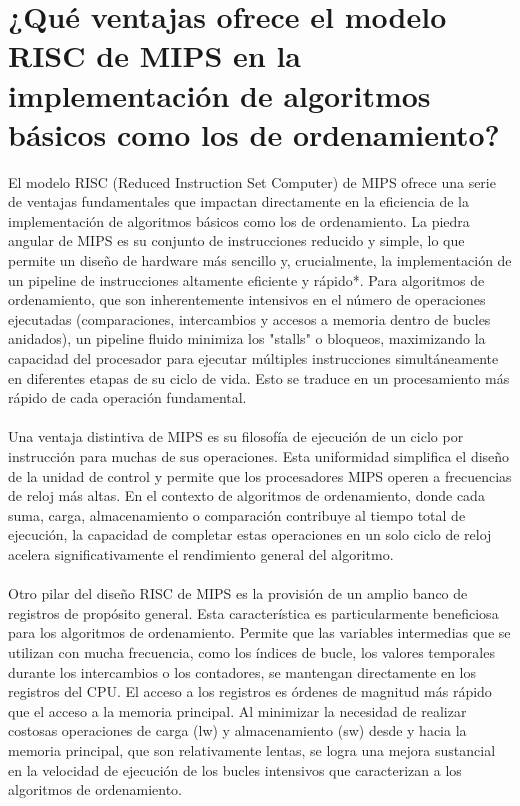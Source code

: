 \documentclass{article}
\begin{document}
\section{¿Qué ventajas ofrece el modelo RISC de MIPS en la implementación de algoritmos básicos como los de ordenamiento?}
El modelo RISC (Reduced Instruction Set Computer) de MIPS ofrece una serie de ventajas fundamentales que impactan directamente en la eficiencia de la implementación de algoritmos básicos como los de ordenamiento. La piedra angular de MIPS es su conjunto de instrucciones reducido y simple, lo que permite un diseño de hardware más sencillo y, crucialmente, la implementación de un pipeline de instrucciones altamente eficiente y rápido*. Para algoritmos de ordenamiento, que son inherentemente intensivos en el número de operaciones ejecutadas (comparaciones, intercambios y accesos a memoria dentro de bucles anidados), un pipeline fluido minimiza los "stalls" o bloqueos, maximizando la capacidad del procesador para ejecutar múltiples instrucciones simultáneamente en diferentes etapas de su ciclo de vida. Esto se traduce en un procesamiento más rápido de cada operación fundamental.
\\
\\Una ventaja distintiva de MIPS es su filosofía de ejecución de un ciclo por instrucción para muchas de sus operaciones. Esta uniformidad simplifica el diseño de la unidad de control y permite que los procesadores MIPS operen a frecuencias de reloj más altas. En el contexto de algoritmos de ordenamiento, donde cada suma, carga, almacenamiento o comparación contribuye al tiempo total de ejecución, la capacidad de completar estas operaciones en un solo ciclo de reloj acelera significativamente el rendimiento general del algoritmo.
\\
\\Otro pilar del diseño RISC de MIPS es la provisión de un amplio banco de registros de propósito general. Esta característica es particularmente beneficiosa para los algoritmos de ordenamiento. Permite que las variables intermedias que se utilizan con mucha frecuencia, como los índices de bucle, los valores temporales durante los intercambios o los contadores, se mantengan directamente en los registros del CPU. El acceso a los registros es órdenes de magnitud más rápido que el acceso a la memoria principal. Al minimizar la necesidad de realizar costosas operaciones de carga (lw) y almacenamiento (sw) desde y hacia la memoria principal, que son relativamente lentas, se logra una mejora sustancial en la velocidad de ejecución de los bucles intensivos que caracterizan a los algoritmos de ordenamiento.
\end{document}
